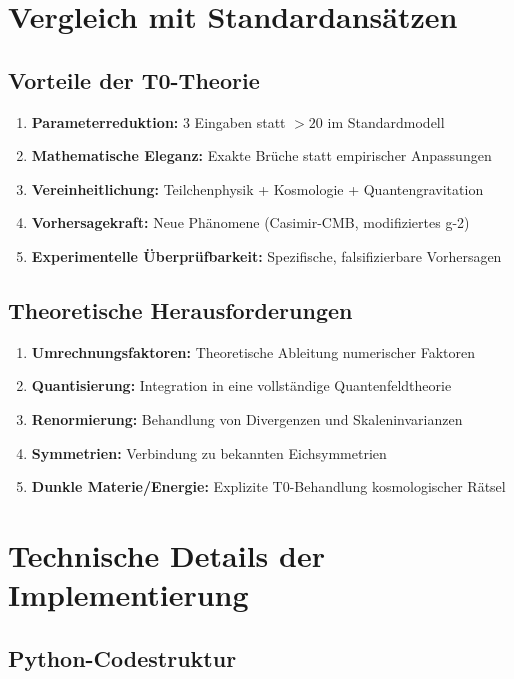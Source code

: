 	\section{Vergleich mit Standardansätzen}
	
	\subsection{Vorteile der T0-Theorie}
	
	\begin{enumerate}
		\item \textbf{Parameterreduktion:} 3 Eingaben statt $>20$ im Standardmodell
		\item \textbf{Mathematische Eleganz:} Exakte Brüche statt empirischer Anpassungen
		\item \textbf{Vereinheitlichung:} Teilchenphysik + Kosmologie + Quantengravitation
		\item \textbf{Vorhersagekraft:} Neue Phänomene (Casimir-CMB, modifiziertes g-2)
		\item \textbf{Experimentelle Überprüfbarkeit:} Spezifische, falsifizierbare Vorhersagen
	\end{enumerate}
	
	\subsection{Theoretische Herausforderungen}
	
	\begin{enumerate}
		\item \textbf{Umrechnungsfaktoren:} Theoretische Ableitung numerischer Faktoren
		\item \textbf{Quantisierung:} Integration in eine vollständige Quantenfeldtheorie
		\item \textbf{Renormierung:} Behandlung von Divergenzen und Skaleninvarianzen
		\item \textbf{Symmetrien:} Verbindung zu bekannten Eichsymmetrien
		\item \textbf{Dunkle Materie/Energie:} Explizite T0-Behandlung kosmologischer Rätsel
	\end{enumerate}
	
	\section{Technische Details der Implementierung}
	
	\subsection{Python-Codestruktur}
	
